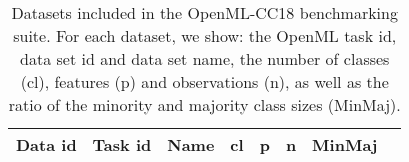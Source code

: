 \documentclass[twoside,11pt]{article}
\begin{document}
\newpage
\begin{table}[h]
\setlength{\tabcolsep}{2pt}
\caption{Datasets included in the OpenML-CC18 benchmarking suite. For each dataset, we show: the OpenML task id, data set id and data set name, the number of classes (cl), features (p) and observations (n), as well as the ratio of the minority and majority class sizes (MinMaj).}
\label{tab:datasets}
\centering

\begin{adjustbox}{center, width=7.75cm, totalheight=12cm}
\begin{tabular}{rrlrrrrr}
\toprule
\textbf{ Data id } & \textbf{Task id} & \textbf{ Name } & \textbf{ cl } & \textbf{ p } & \textbf{ n } & \textbf{MinMaj}\\
\midrule




\end{tabular}
\end{adjustbox}
\end{table}
\end{document}
